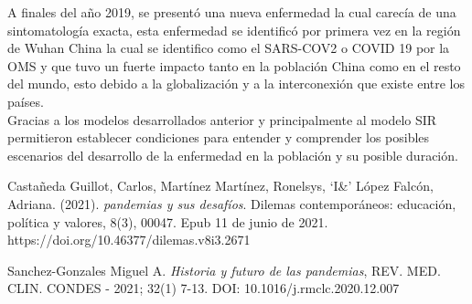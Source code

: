\documentclass[a4paper,openany,12pt]{book}
\begin{document}
A finales del año 2019, se presentó una nueva enfermedad la cual carecía de una sintomatología exacta, esta enfermedad se identificó por primera vez en la región de Wuhan China la cual se identifico como el SARS-COV2 o COVID 19 por la OMS y que tuvo un fuerte impacto tanto en la población China como en el resto del mundo, esto debido a la globalización y a la interconexión que existe entre los países.\\

Gracias a los modelos desarrollados anterior y principalmente al modelo SIR permitieron establecer condiciones para entender y comprender los posibles escenarios del desarrollo de la enfermedad en la población y su posible duración.\\

 

\begin{thebibliography}{3}

Castañeda Guillot, Carlos, Martínez Martínez, Ronelsys, `I\&' López Falcón, Adriana. (2021). \textit{pandemias y sus desafíos}. Dilemas contemporáneos: educación, política y valores, 8(3), 00047. Epub 11 de junio de 2021. https://doi.org/10.46377/dilemas.v8i3.2671


Sanchez-Gonzales Miguel A. \textit{Historia y futuro de las pandemias}, REV. MED. CLIN. CONDES - 2021; 32(1) 7-13. 
DOI: 10.1016/j.rmclc.2020.12.007


\end{thebibliography}
\end{document}
